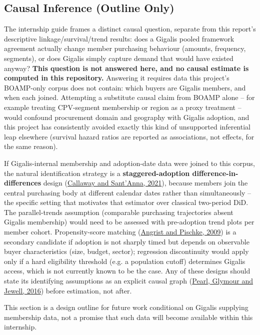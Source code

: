 \documentclass[11pt,a4paper]{article}
\begin{document}
\subsection{Causal Inference (Outline Only)}
\label{sec:causal-inference}
The internship guide frames a distinct causal question, separate from this
report's descriptive linkage/survival/trend results: does a Gigalis pooled
framework agreement actually change member purchasing behaviour (amounts,
frequency, segments), or does Gigalis simply capture demand that would have
existed anyway? \textbf{This question is not answered here, and no causal
estimate is computed in this repository.} Answering it requires data this
project's BOAMP-only corpus does not contain: which buyers are Gigalis
members, and when each joined. Attempting a substitute causal claim from
BOAMP alone -- for example treating CPV-segment membership or region as a
proxy treatment -- would confound procurement domain and geography with
Gigalis adoption, and this project has consistently avoided exactly this kind
of unsupported inferential leap elsewhere (survival hazard ratios are reported
as associations, not effects, for the same reason).

If Gigalis-internal membership and adoption-date data were joined to this
corpus, the natural identification strategy is a \textbf{staggered-adoption
difference-in-differences} design
(\href{https://doi.org/10.1016/j.jeconom.2020.12.001}{Callaway and
Sant'Anna, 2021}), because members join the central purchasing body at
different calendar dates rather than simultaneously -- the specific setting
that motivates that estimator over classical two-period DiD. The parallel-trends
assumption (comparable purchasing trajectories absent Gigalis membership)
would need to be assessed with pre-adoption trend plots per member cohort.
Propensity-score matching
(\href{https://www.jstor.org/stable/j.ctvcm4j72}{Angrist and Pischke,
2009}) is a secondary candidate if adoption is not sharply timed but depends
on observable buyer characteristics (size, budget, sector); regression
discontinuity would apply only if a hard eligibility threshold (e.g. a
population cutoff) determines Gigalis access, which is not currently known to
be the case. Any of these designs should state its identifying assumptions as
an explicit causal graph
(\href{https://www.wiley.com/en-us/Causal+Inference+in+Statistics\%3A+A+Primer-p-9781119186847}{Pearl,
Glymour and Jewell, 2016}) before estimation, not after.

This section is a design outline for future work conditional on Gigalis
supplying membership data, not a promise that such data will become available
within this internship.
\end{document}

